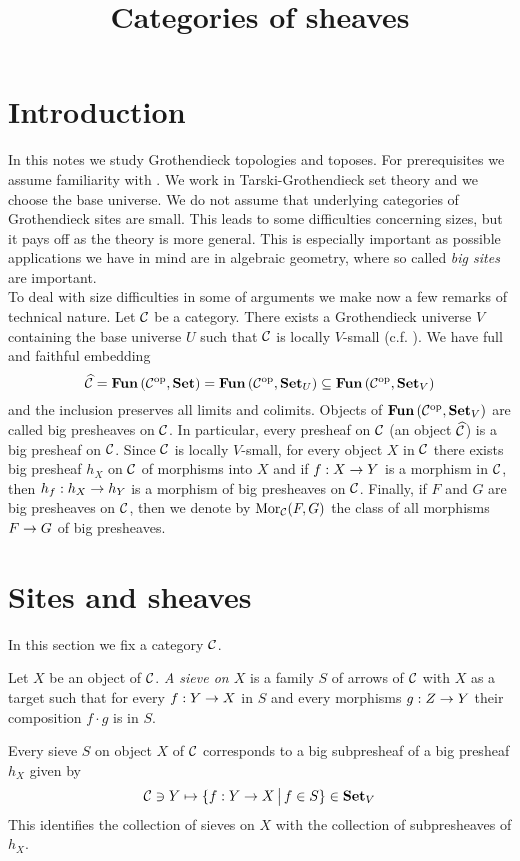 



\title{Categories of sheaves}
\date{}
\maketitle

\section{Introduction}
\noindent
In this notes we study Grothendieck topologies and toposes. For prerequisites we assume familiarity with \cite{Presheaves}. We work in Tarski-Grothendieck set theory and we choose the base universe. We do not assume that underlying categories of Grothendieck sites are small. This leads to some difficulties concerning sizes, but it pays off as the theory is more general. This is especially important as possible applications we have in mind are in algebraic geometry, where so called \textit{big sites} are important.\\
To deal with size difficulties in some of arguments we make now a few remarks of technical nature. Let ${\mathcal C}$ be a category. There exists a Grothendieck universe $V$ containing the base universe $U$ such that ${\mathcal C}$ is locally $V$-small (c.f. {\cite[section 1]{Presheaves}}). We have full and faithful embedding
$$\widehat{{\mathcal C}} = \mathbf{Fun}\left({\mathcal C}^{\mathrm{op}},\mathbf{Set}\right) =  \mathbf{Fun}\left({\mathcal C}^{\mathrm{op}},\mathbf{Set}_U\right)\subseteq  \mathbf{Fun}\left({\mathcal C}^{\mathrm{op}},\mathbf{Set}_V\right)$$
and the inclusion preserves all limits and colimits. Objects of $\mathbf{Fun}\left({\mathcal C}^{\mathrm{op}},\mathbf{Set}_V\right)$ are called big presheaves on ${\mathcal C}$. In particular, every presheaf on ${\mathcal C}$ (an object $\widehat{{\mathcal C}}$) is a big presheaf on ${\mathcal C}$. Since ${\mathcal C}$ is locally $V$-small, for every object $X$ in ${\mathcal C}$ there exists big presheaf $h_X$ on ${\mathcal C}$ of morphisms into $X$ and if $f:X\rightarrow Y$ is a morphism in ${\mathcal C}$, then $h_f:h_X\rightarrow h_Y$ is a morphism of big presheaves on ${\mathcal C}$. Finally, if $F$ and $G$ are big presheaves on ${\mathcal C}$, then we denote by $\mathrm{Mor}_{{\mathcal C}}(F,G)$ the class of all morphisms $F\rightarrow G$ of big presheaves. 

\section{Sites and sheaves}
\noindent
In this section we fix a category ${\mathcal C}$.

\begin{definition}
Let $X$ be an object of ${\mathcal C}$. \textit{A sieve on $X$} is a family $S$ of arrows of ${\mathcal C}$ with $X$ as a target such that for every $f:Y\rightarrow X$ in $S$ and every morphisms $g:Z\rightarrow Y$ their composition $f\cdot g$ is in $S$.
\end{definition}
\noindent
Every sieve $S$ on object $X$ of ${\mathcal C}$ corresponds to a big subpresheaf of a big presheaf $h_X$ given by
$${\mathcal C}\ni Y\mapsto \{f:Y\rightarrow X\,\big|\,f\in S\}\in \mathbf{Set}_V$$
This identifies the collection of sieves on $X$ with the collection of subpresheaves of $h_X$.


